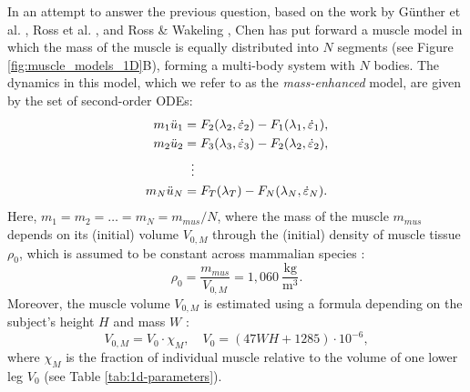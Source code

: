 \documentclass{sfuthesis}
\numberwithin{equation}{section}
\numberwithin{figure}{chapter}
\numberwithin{table}{chapter}
\theoremstyle{definition}
\newcommand{\depsilon}{\dot{\varepsilon}}
\begin{document}
In an attempt to answer the previous question, based on the work by G\"{u}nther et al. \cite{Gunther2012}, Ross et al. \cite{Ross2018}, and Ross \& Wakeling \cite{RossWakeling2016Multibody, RossPaper4}, Chen \cite{EvanThesis} has put forward a muscle model in which the mass of the muscle is equally distributed into $N$ segments (see Figure \ref{fig:muscle_models_1D}B), forming a multi-body system with $N$ bodies. The dynamics in this model, which we refer to as the \textit{mass-enhanced} model, are given by the set of second-order ODEs:
\begin{subequations} \label{eq:massenhanced_model}
    \begin{align}
        m_1 \ddot{u}_1 &= F_2(\lambda_2, \depsilon_2) - F_1(\lambda_1, \depsilon_1), \\
        m_2 \ddot{u}_2 &= F_3(\lambda_3, \depsilon_3) - F_2(\lambda_2, \depsilon_2), \\
        &\hspace{0.6em} \vdots \notag \\
        m_N \ddot{u}_N &= F_T(\lambda_T) - F_N(\lambda_N, \depsilon_N).
    \end{align}
\end{subequations}
Here, $m_1 = m_2 = \dots = m_N = m_{mus}/N$, where the mass of the muscle $m_{mus}$ depends on its (initial) volume $V_{0,M}$ through the (initial) density of muscle tissue $\rho_0$, which is assumed to be constant across mammalian species \cite{MendezKeys1960}:
\begin{equation}
    \rho_0 = \dfrac{m_{mus}}{V_{0,M}} = 1,060 \ \dfrac{\text{kg}}{\text{m}^3}.
\end{equation}
Moreover, the muscle volume $V_{0,M}$ is estimated using a formula depending on the subject's height $H$ and mass $W$ \cite{Hansfield2014}:
\begin{equation}
    V_{0,M} = V_0 \cdot \chi_M, \quad V_0 = (47WH + 1285) \cdot 10^{-6},
\end{equation}
where $\chi_M$ is the fraction of individual muscle relative to the volume of one lower leg $V_0$ (see Table \ref{tab:1d-parameters}).
\end{document}
